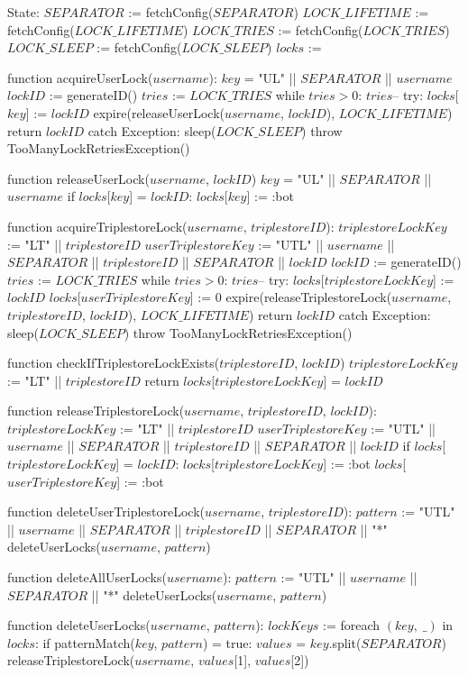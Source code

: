 State:
    $SEPARATOR$ := fetchConfig($SEPARATOR$)
    $LOCK\_LIFETIME$ := fetchConfig($LOCK\_LIFETIME$)
    $LOCK\_TRIES$ := fetchConfig($LOCK\_TRIES$)
    $LOCK\_SLEEP$ := fetchConfig($LOCK\_SLEEP$)
    $locks$ := {}

function acquireUserLock($username$):
    $key$ = "UL" || $SEPARATOR$ || $username$
    $lockID$ := generateID()
    $tries$ := $LOCK\_TRIES$
    while $tries > 0$:
        $tries$--
        try:
            $locks$[$key$] := $lockID$
            expire(releaseUserLock($username$, $lockID$), $LOCK\_LIFETIME$)
            return $lockID$
        catch Exception:
            sleep($LOCK\_SLEEP$)
    throw TooManyLockRetriesException()

function releaseUserLock($username$, $lockID$) 
    $key$ = "UL" || $SEPARATOR$ || $username$
    if $locks$[$key$] = $lockID$:
        $locks$[$key$] := :bot

function acquireTriplestoreLock($username$, $triplestoreID$):
    $triplestoreLockKey$ := "LT" || $triplestoreID$
    $userTriplestoreKey$ := "UTL" || $username$ || $SEPARATOR$ || $triplestoreID$ || $SEPARATOR$ || $lockID$
    $lockID$ := generateID()
    $tries$ := $LOCK\_TRIES$
    while $tries > 0$:
        $tries$--
        try:
            $locks$[$triplestoreLockKey$] := $lockID$
            $locks$[$userTriplestoreKey$] := 0
            expire(releaseTriplestoreLock($username$, $triplestoreID$, $lockID$), $LOCK\_LIFETIME$)
            return $lockID$
        catch Exception:
            sleep($LOCK\_SLEEP$)
    throw TooManyLockRetriesException()

function checkIfTriplestoreLockExists($triplestoreID$, $lockID$)
    $triplestoreLockKey$ := "LT" || $triplestoreID$
    return $locks$[$triplestoreLockKey$] = $lockID$

function releaseTriplestoreLock($username$, $triplestoreID$, $lockID$):
    $triplestoreLockKey$ := "LT" || $triplestoreID$
    $userTriplestoreKey$ := "UTL" || $username$ || $SEPARATOR$ || $triplestoreID$ || $SEPARATOR$ || $lockID$
    if $locks$[$triplestoreLockKey$] = $lockID$:
        $locks$[$triplestoreLockKey$] := :bot
        $locks$[$userTriplestoreKey$] := :bot

function deleteUserTriplestoreLock($username$, $triplestoreID$):
    $pattern$ := "UTL" || $username$ || $SEPARATOR$ || $triplestoreID$ || $SEPARATOR$ || "*"
    deleteUserLocks($username$, $pattern$)

function deleteAllUserLocks($username$):
    $pattern$ := "UTL" || $username$ || $SEPARATOR$ || "*"
    deleteUserLocks($username$, $pattern$)

function deleteUserLocks($username$, $pattern$):
    $lockKeys$ := {}
    foreach $(key, \; \_)$ in $locks$:
        if patternMatch($key$, $pattern$) = true:
            $values$ = $key$.split($SEPARATOR$)
            releaseTriplestoreLock($username$, $values$[1], $values$[2])